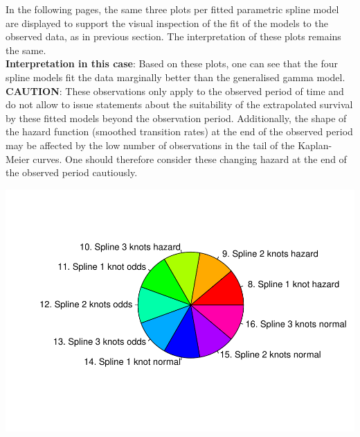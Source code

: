 \documentclass[
]{article}
\begin{document}
In the following pages, the same three plots per fitted parametric
spline model are displayed to support the visual inspection of the fit
of the models to the observed data, as in previous section. The
interpretation of these plots remains the same.\\
\textbf{Interpretation in this case}: Based on these plots, one can see
that the four spline models fit the data marginally better than the
generalised gamma model.\\
\textbf{CAUTION}: These observations only apply to the observed period
of time and do not allow to issue statements about the suitability of
the extrapolated survival by these fitted models beyond the observation
period. Additionally, the shape of the hazard function (smoothed
transition rates) at the end of the observed period may be affected by
the low number of observations in the tail of the Kaplan-Meier curves.
One should therefore consider these changing hazard at the end of the
observed period cautiously.

\begin{flushleft}\includegraphics{Images/spline-1} \end{flushleft}
\end{document}
